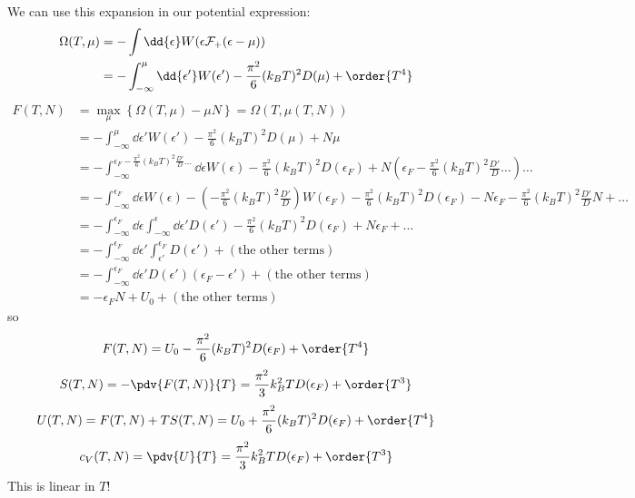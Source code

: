 \documentclass[a4paper,twoside,master.tex]{subfiles}
\begin{document}
We can use this expansion in our potential expression:
\begin{align}
    \Omega(T, \mu) &= - \int \dd{\epsilon} W(\epsilon \mathcal{F}_+(\epsilon - \mu)) \\
    &= - \int_{- \infty}^{\mu} \dd{\epsilon'} W(\epsilon') - \frac{\pi^2}{6} (k_B T)^2 D(\mu) + \order{T^4}
\end{align}
\begin{align}
    F(T,N) &= \max_{\mu} \left\{ \Omega(T, \mu) - \mu N \right\} = \Omega(T, \mu(T, N)) \\
    &= - \int_{- \infty}^{\mu} \dd{\epsilon'} W(\epsilon') - \frac{\pi^2}{6} (k_B T)^2 D(\mu) + N \mu \\
    &= - \int_{- \infty}^{\epsilon_F - \frac{\pi^2}{6}(k_B T)^2 \frac{D'}{D} \ldots} \dd{\epsilon} W(\epsilon) - \frac{\pi^2}{6} (k_B T)^2 D(\epsilon_F) + N \left( \epsilon_F - \frac{\pi^2}{6} (k_B T)^2 \frac{D'}{D} \ldots \right) \ldots\\
    &= - \int_{- \infty}^{\epsilon_F} \dd{\epsilon} W(\epsilon) - \left( - \frac{\pi^2}{6} (k_B T)^2 \frac{D'}{D} \right) W(\epsilon_F) - \frac{\pi^2}{6} (k_B T)^2 D(\epsilon_F) - N \epsilon_F - \frac{\pi^2}{6} (k_B T)^2 \frac{D'}{D} N + \ldots \\
    &= - \int_{- \infty}^{\epsilon_F} \dd{\epsilon} \int_{- \infty}^{\epsilon} \dd{\epsilon'} D(\epsilon') - \frac{\pi^2}{6} (k_B T)^2 D(\epsilon_F) + N \epsilon_F + \ldots \\
    &= - \int_{- \infty}^{\epsilon_F} \dd{\epsilon'} \int_{\epsilon'}^{\epsilon_F} D(\epsilon') + (\text{the other terms}) \\
    &= - \int_{- \infty}^{\epsilon_F} \dd{\epsilon'} D(\epsilon') (\epsilon_F - \epsilon') + (\text{the other terms}) \\
    &= - \epsilon_F N + U_0 + (\text{the other terms})
\end{align}
so
\begin{equation}
    F(T, N) = U_0 - \frac{\pi^2}{6} (k_B T)^2 D(\epsilon_F) + \order{T^4}
\end{equation}
\begin{equation}
    S(T,N) = - \pdv{F(T,N)}{T} = \frac{\pi^2}{3} k_B^2 T D(\epsilon_F) + \order{T^3}
\end{equation}
\begin{equation}
    U(T,N) = F(T,N) + TS(T,N) = U_0 + \frac{\pi^2}{6} (k_B T)^2 D(\epsilon_F) + \order{T^4}
\end{equation}
\begin{equation}
    c_V(T,N) = \pdv{U}{T}= \frac{\pi^2}{3} k_B^2 T D(\epsilon_F) + \order{T^3}
\end{equation}
This is linear in $ T $!
\end{document}
